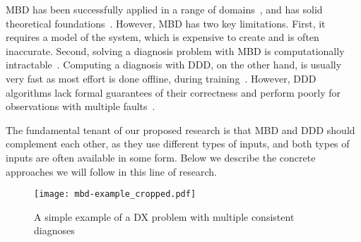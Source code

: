 \documentclass[12pt]{article}
\begin{document}
MBD has been successfully applied in a range of domains~\cite{williams96,struss2003model,wotawa2002model}, and has solid theoretical foundations~\cite{deKleer1987diagnosing,reiter1987theory}. However, MBD has two key limitations. First, it requires a model of the system, which is expensive to create and is often inaccurate. Second, solving a diagnosis problem with MBD is computationally intractable~\cite{bylander1991computational}. Computing a diagnosis with DDD, on the other hand, is usually very fast as most effort is done offline, during training~\cite{muralidharan2014fault}. However, DDD algorithms lack formal guarantees of their correctness and perform poorly for observations with multiple faults~\cite{keren2011model}. 


The fundamental tenant of our proposed research is that MBD and DDD should complement each other, as they use different types of inputs, and both types of inputs are often available in some form. 
Below we describe the concrete approaches we will follow in this line of research.



\begin{figure}
    \centering
	\texttt{[image: mbd-example\_cropped.pdf]}
    \caption{A simple example of a DX problem with multiple consistent diagnoses}
    \label{fig:mbd-example}
\end{figure}
\end{document}
